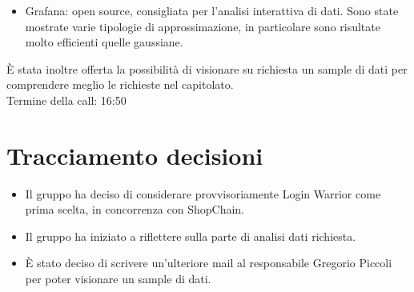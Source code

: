 \begin{itemize}
	\item Grafana: open source, consigliata per l'analisi interattiva di dati. Sono state mostrate varie tipologie di approssimazione, in particolare sono risultate molto efficienti quelle gaussiane.
\end{itemize}

\noindent 
\`E stata inoltre offerta la possibilità di visionare su richiesta un sample di dati per comprendere meglio le richieste nel capitolato. \\
Termine della call: 16:50

\section{Tracciamento decisioni}

\begin{itemize}
	\item Il gruppo ha deciso di considerare provvisoriamente Login Warrior come prima scelta, in concorrenza con ShopChain.
	\item Il gruppo ha iniziato a riflettere sulla parte di analisi dati richiesta.
	\item \`E stato deciso di scrivere un'ulteriore mail al responsabile Gregorio Piccoli per poter visionare un sample di dati.
\end{itemize}